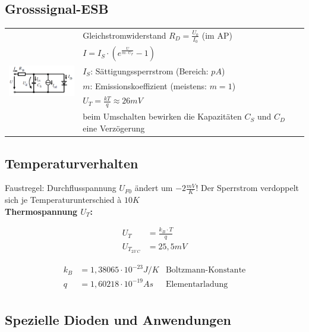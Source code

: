 	\subsection{Grosssignal-ESB}
		\begin{tabular}{l l}
			\multirow{6}{*}{\includegraphics[width=4cm]{./images/Diode-GS-ESB.png}}
			& Gleichstromwiderstand $R_D = \frac{U_0}{I_0}$ (im AP)\\
			& $I=I_S \cdot (e^{\frac{U}{m \cdot U_T}}-1)$ \\
			& $I_S$: Sättigungssperrstrom (Bereich: $pA$)\\
			& $m$: Emissionskoeffizient (meistens: $m=1$) \\
			& $U_T=\frac{kT}{q} \approx 26mV$ \\
			& beim Umschalten bewirken die Kapazitäten $C_S$ und $C_D$ eine Verzögerung \\
		\end{tabular}
		
	\subsection{Temperaturverhalten}
		Faustregel: Durchflusspannung $U_{F0}$ ändert um $-2 \frac{mV}{K}$! Der Sperrstrom verdoppelt sich je Temperaturunterschied à $10K$ \\
		
		\textbf{Thermospannung $U_T$:} \\
		\begin{minipage}{6cm}
			\begin{align*}
				U_T &= \frac{k_B \cdot T}{q} \\
				U_{T_{23^{\circ}C}} &= 25,5 mV 
			\end{align*}
		\end{minipage}
		\begin{minipage}{10cm}
			\begin{align*}
			k_B &= 1,38065 \cdot 10^{-23} J/K &\text{Boltzmann-Konstante} \\
			q &= 1,60218 \cdot 10^{-19} As &\text{Elementarladung} \\
			\end{align*}
		\end{minipage}
	
	\subsection{Spezielle Dioden und Anwendungen}
